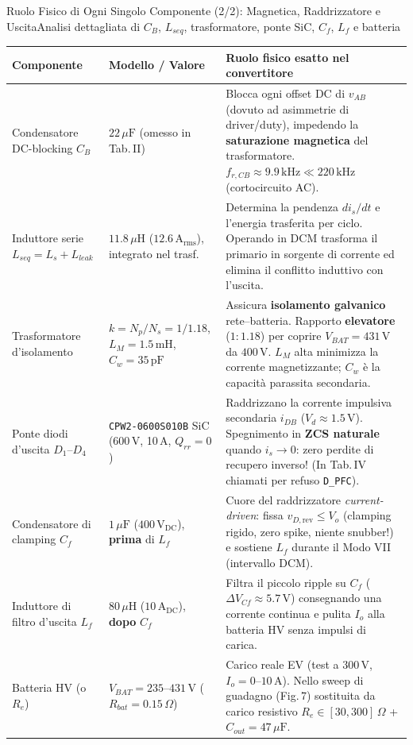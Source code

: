 \documentclass[aspectratio=169,9pt]{beamer}
\newcommand{\V}{\,\text{V}}
\newcommand{\A}{\,\text{A}}
\newcommand{\kHz}{\,\text{kHz}}
\newcommand{\uH}{\,\mu\text{H}}
\newcommand{\mH}{\,\text{mH}}
\newcommand{\uF}{\,\mu\text{F}}
\newcommand{\pF}{\,\text{pF}}
\newcommand{\Ohm}{\,\Omega}
\begin{document}
\begin{frame}{Ruolo Fisico di Ogni Singolo Componente (2/2): Magnetica, Raddrizzatore e Uscita}{Analisi dettagliata di $C_B$, $L_{seq}$, trasformatore, ponte SiC, $C_f$, $L_f$ e batteria}
  \scriptsize
  \setlength{\tabcolsep}{3.5pt}
  \renewcommand{\arraystretch}{1.18}
  \begin{tabular}{@{}>{\raggedright\arraybackslash}p{2.25cm}>{\raggedright\arraybackslash}p{2.85cm}>{\raggedright\arraybackslash}p{8.8cm}@{}}
    \toprule
    \textbf{Componente} & \textbf{Modello / Valore} & \textbf{Ruolo fisico esatto nel convertitore} \\
    \midrule
    Condensatore DC-blocking $C_B$ & $22\uF$ (omesso in Tab.\,II) & Blocca ogni offset DC di $v_{AB}$ (dovuto ad asimmetrie di driver/duty), impedendo la \textbf{saturazione magnetica} del trasformatore. $f_{r,CB}\approx 9.9\kHz \ll 220\kHz$ (cortocircuito AC). \\
    Induttore serie $L_{seq} = L_s + L_{leak}$ & $11.8\uH$ ($12.6\A_{\text{rms}}$), integrato nel trasf. & Determina la pendenza $di_s/dt$ e l'energia trasferita per ciclo. Operando in DCM trasforma il primario in sorgente di corrente ed elimina il conflitto induttivo con l'uscita. \\
    Trasformatore d'isolamento & $k = N_p/N_s = 1/1.18$, $L_M=1.5\mH$, $C_w=35\pF$ & Assicura \textbf{isolamento galvanico} rete--batteria. Rapporto \textbf{elevatore} ($1:1.18$) per coprire $V_{BAT}=431\V$ da $400\V$. $L_M$ alta minimizza la corrente magnetizzante; $C_w$ \`e la capacit\`a parassita secondaria. \\
    Ponte diodi d'uscita $D_1\text{--}D_4$ & \texttt{CPW2-0600S010B} SiC (600\,V, 10\,A, $Q_{rr}=0$) & Raddrizzano la corrente impulsiva secondaria $i_{DB}$ ($V_d\approx 1.5\V$). Spegnimento in \textbf{ZCS naturale} quando $i_s\to 0$: zero perdite di recupero inverso! (In Tab.\,IV chiamati per refuso \texttt{D\_PFC}). \\
    Condensatore di clamping $C_f$ & $1\uF$ ($400\V_{\text{DC}}$), \textbf{prima} di $L_f$ & Cuore del raddrizzatore \emph{current-driven}: fissa $v_{D,\text{rev}} \le V_o$ (clamping rigido, zero spike, niente snubber!) e sostiene $L_f$ durante il Modo VII (intervallo DCM). \\
    Induttore di filtro d'uscita $L_f$ & $80\uH$ ($10\A_{\text{DC}}$), \textbf{dopo} $C_f$ & Filtra il piccolo ripple su $C_f$ ($\Delta V_{Cf}\approx 5.7\V$) consegnando una corrente continua e pulita $I_o$ alla batteria HV senza impulsi di carica. \\
    Batteria HV (o $R_e$) & $V_{BAT}=235\text{--}431\V$ ($R_{bat}=0.15\Ohm$) & Carico reale EV (test a $300\V$, $I_o=0\text{--}10\A$). Nello sweep di guadagno (Fig.\,7) sostituita da carico resistivo $R_e \in [30, 300]\Ohm$ + $C_{out}=47\uF$. \\
    \bottomrule
  \end{tabular}
\end{frame}
\end{document}
